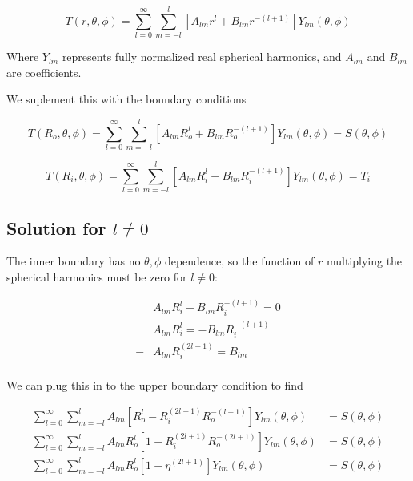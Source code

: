 \documentclass[a4paper,10pt]{article}
\begin{document}
\begin{equation}
T(r, \theta, \phi) = \displaystyle \sum_{l=0}^{\infty} \sum_{m=-l}^{l} \left[ A_{lm} r^l + B_{lm} r^{-(l+1)} \right] Y_{lm}(\theta,\phi)
\end{equation}

Where $Y_{lm}$ represents fully normalized real spherical harmonics, and $A_{lm}$ and $B_{lm}$ are coefficients.

We suplement this with the boundary conditions

\begin{equation}
T(R_o, \theta, \phi) = \displaystyle \sum_{l=0}^{\infty} \sum_{m=-l}^{l} \left[ A_{lm} R_o^l + B_{lm} R_o^{-(l+1)} \right] Y_{lm}(\theta,\phi) = S(\theta, \phi)
\end{equation}

\begin{equation}
T(R_i, \theta, \phi) = \displaystyle \sum_{l=0}^{\infty} \sum_{m=-l}^{l} \left[ A_{lm} R_i^l + B_{lm} R_i^{-(l+1)} \right] Y_{lm}(\theta,\phi) = T_i
\end{equation}


\subsection{Solution for $l \ne 0$}

The inner boundary has no $\theta, \phi$ dependence, so the function of $r$ multiplying the spherical harmonics must be zero for $l \ne 0$:

\begin{equation}
\begin{aligned}
&A_{lm} R_i^l + B_{lm} R_i^{-(l+1)} = 0 \\
&A_{lm} R_i^l = - B_{lm} R_i^{-(l+1)} \\
-&A_{lm} R_i^{(2l + 1)} = B_{lm} \\
\end{aligned}
\end{equation}

We can plug this in to the upper boundary condition to find


\begin{equation}
\begin{aligned}
\displaystyle \sum_{l=0}^{\infty} \sum_{m=-l}^{l} A_{lm} \left[R_o^l - R_i^{(2l+1)} R_o^{-(l+1)} \right] Y_{lm}(\theta,\phi) &= S(\theta, \phi) \\
\displaystyle \sum_{l=0}^{\infty} \sum_{m=-l}^{l} A_{lm} R_o^{l} \left[1 - R_i^{(2l+1)} R_o^{-(2l+1)} \right] Y_{lm}(\theta,\phi) &= S(\theta, \phi) \\
\displaystyle \sum_{l=0}^{\infty} \sum_{m=-l}^{l} A_{lm} R_o^{l} \left[1 - \eta^{(2l+1)} \right] Y_{lm}(\theta,\phi) &= S(\theta, \phi) \\
\end{aligned}
\end{equation}
\end{document}
